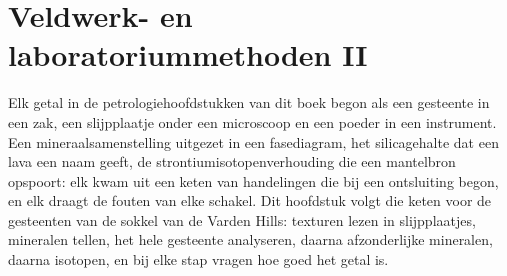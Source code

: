 \chapter{Veldwerk- en laboratoriummethoden II}\label{ch:b2:field-lab-methods-2}

Elk getal in de petrologiehoofdstukken van dit boek begon als een gesteente in een zak, een slijpplaatje onder een
microscoop en een poeder in een instrument. Een mineraalsamenstelling uitgezet in een fasediagram, het
silicagehalte dat een lava een naam geeft, de strontiumisotopenverhouding die een mantelbron opspoort: elk
kwam uit een keten van handelingen die bij een ontsluiting begon, en elk draagt de fouten van elke
schakel. Dit hoofdstuk volgt die keten voor de gesteenten van de sokkel van de Varden Hills: texturen lezen
in slijpplaatjes, mineralen tellen, het hele gesteente analyseren, daarna afzonderlijke mineralen, daarna isotopen,
en bij elke stap vragen hoe goed het getal is.

